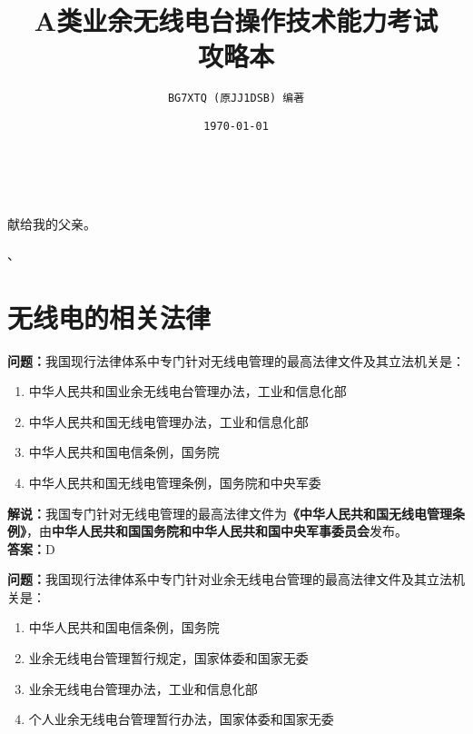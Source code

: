 \documentclass{ctexbook}
\title{\Huge {\sffamily A类业余无线电台操作技术能力考试\\攻略本}} %
\author{\Large \texttt{BG7XTQ (原JJ1DSB) 编著}} %
\date{\Large {\texttt \today} }  %
\begin{document}

\maketitle%

\thispagestyle{empty}
\vfil
\ \\
\vspace{15em}
\begin{center}
	{\Large 献给我的父亲。}
\end{center}、

\newpage

\tableofcontents%






\chapter{无线电的相关法律}



\noindent\textbf{问题：}我国现行法律体系中专门针对无线电管理的最高法律文件及其立法机关是：

\begin{enumerate}[label=\Alph*), leftmargin=3em]
	\item 中华人民共和国业余无线电台管理办法，工业和信息化部
	\item 中华人民共和国无线电管理办法，工业和信息化部
	\item 中华人民共和国电信条例，国务院
	\item 中华人民共和国无线电管理条例，国务院和中央军委
\end{enumerate}

\noindent\textbf{解说：}我国专门针对无线电管理的最高法律文件为\textbf{《中华人民共和国无线电管理条例》}，由\textbf{中华人民共和国国务院和中华人民共和国中央军事委员会}发布。\\\noindent\textbf{答案：}D

\bigskip


\noindent\textbf{问题：}我国现行法律体系中专门针对业余无线电台管理的最高法律文件及其立法机关是：

\begin{enumerate}[label=\Alph*), leftmargin=3em]
	\item 中华人民共和国电信条例，国务院
	\item 业余无线电台管理暂行规定，国家体委和国家无委
	\item 业余无线电台管理办法，工业和信息化部
	\item 个人业余无线电台管理暂行办法，国家体委和国家无委
\end{enumerate}
\end{document}
